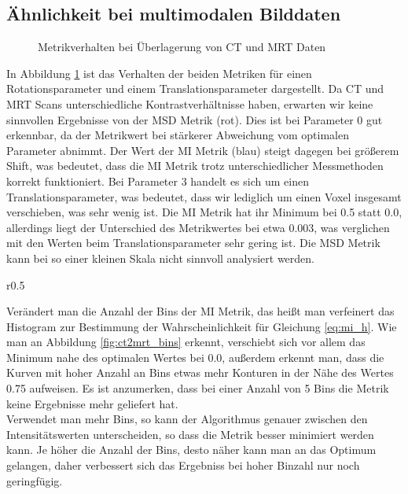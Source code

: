 \subsection{Ähnlichkeit bei multimodalen Bilddaten}
\begin{figure}[h]
  \caption{Metrikverhalten bei Überlagerung von CT und MRT Daten}
  \label{fig:ct2mrt_param}
  \vspace{-10pt}
  \resizebox{0.48\linewidth}{!}{}
  \hfill
  \resizebox{0.48\linewidth}{!}{}
  \vspace{-10pt}
\end{figure}
In Abbildung \ref{fig:ct2mrt_param} ist das Verhalten der beiden Metriken für
einen Rotationsparameter und einem Translationsparameter dargestellt. Da CT und
MRT Scans unterschiedliche Kontrastverhältnisse haben, erwarten wir keine
sinnvollen Ergebnisse von der MSD Metrik (rot). Dies ist bei Parameter \num{0}
gut erkennbar, da der Metrikwert bei stärkerer Abweichung vom optimalen
Parameter abnimmt. Der Wert der MI Metrik (blau) steigt dagegen bei größerem
Shift, was bedeutet, dass die MI Metrik trotz unterschiedlicher Messmethoden
korrekt funktioniert.
Bei Parameter \num{3} handelt es sich um einen Translationsparameter, was
bedeutet, dass wir lediglich um einen Voxel insgesamt verschieben, was sehr
wenig ist. Die MI Metrik hat ihr Minimum bei \num{0.5} statt \num{0.0},
allerdings liegt der Unterschied des Metrikwertes bei etwa \num{0.003}, was
verglichen mit den Werten beim Translationsparameter sehr gering ist. Die MSD
Metrik kann bei so einer kleinen Skala nicht sinnvoll analysiert werden.
\vspace{12pt}
\begin{wrapfigure}{r}{0.5\linewidth}
  \vspace{-10pt}
  \caption{}
  \label{fig:ct2mrt_bins}
  \vspace{-10pt}
  \resizebox{\linewidth}{!}{}
  \vspace{-30pt}
\end{wrapfigure}
Verändert man die Anzahl der Bins der MI Metrik, das heißt man verfeinert das
Histogram zur Bestimmung der Wahrscheinlichkeit für Gleichung \ref{eq:mi_h}.
Wie man an Abbildung \ref{fig:ct2mrt_bins} erkennt, verschiebt sich vor allem
das Minimum nahe des optimalen Wertes bei \num{0.0}, außerdem erkennt man, dass
die Kurven mit hoher Anzahl an Bins etwas mehr Konturen in der Nähe des Wertes
\num{0.75} aufweisen. Es ist anzumerken, dass bei einer Anzahl von \num{5} Bins
die Metrik keine Ergebnisse mehr geliefert hat.\\
Verwendet man mehr Bins, so kann der Algorithmus genauer zwischen den
Intensitätswerten unterscheiden, so dass die Metrik besser minimiert werden
kann. Je höher die Anzahl der Bins, desto näher kann man an das Optimum
gelangen, daher verbessert sich das Ergebniss bei hoher Binzahl nur noch
geringfügig.

